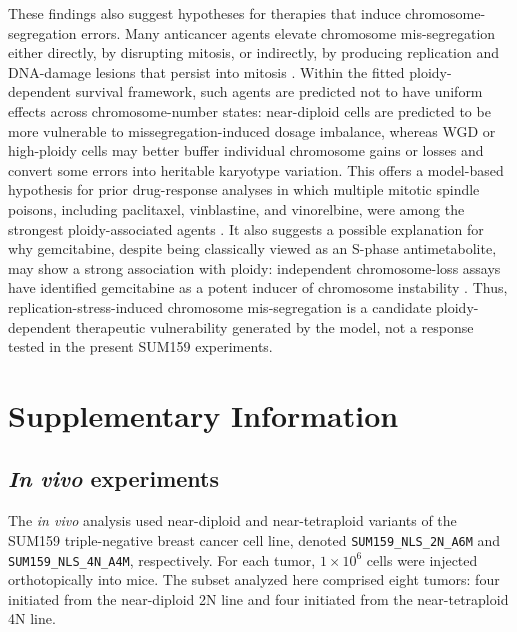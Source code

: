 \documentclass[11pt]{article}
\begin{document}
These findings also suggest hypotheses for therapies that induce chromosome-segregation errors. Many anticancer agents elevate chromosome mis-segregation either directly, by disrupting mitosis, or indirectly, by producing replication and DNA-damage lesions that persist into mitosis \cite{lee_effects_2016,zasadil_cytotoxicity_2014,scribano_chromosomal_2021,pedersen_topbp1_2015,chan_replication_2009,minocherhomji_replication_2015,beeharry_centromere_2013}. Within the fitted ploidy-dependent survival framework, such agents are predicted not to have uniform effects across chromosome-number states: near-diploid cells are predicted to be more vulnerable to missegregation-induced dosage imbalance, whereas WGD or high-ploidy cells may better buffer individual chromosome gains or losses and convert some errors into heritable karyotype variation. This offers a model-based hypothesis for prior drug-response analyses in which multiple mitotic spindle poisons, including paclitaxel, vinblastine, and vinorelbine, were among the strongest ploidy-associated agents \cite{kimmel_integrating_2020}. It also suggests a possible explanation for why gemcitabine, despite being classically viewed as an S-phase antimetabolite, may show a strong association with ploidy: independent chromosome-loss assays have identified gemcitabine as a potent inducer of chromosome instability \cite{lee_effects_2016}. Thus, replication-stress-induced chromosome mis-segregation is a candidate ploidy-dependent therapeutic vulnerability generated by the model, not a response tested in the present SUM159 experiments.

\section{Supplementary Information}


\renewcommand{\figurename}{Supplementary Figure}
\setcounter{figure}{0}  
\renewcommand{\tablename}{Supplementary Table}
\setcounter{table}{0}  

\subsection{\textit{In vivo} experiments}
\label{invivo}

The \textit{in vivo} analysis used near-diploid and near-tetraploid variants of the SUM159 triple-negative breast cancer cell line, denoted \texttt{SUM159\_NLS\_2N\_A6M} and \texttt{SUM159\_NLS\_4N\_A4M}, respectively. For each tumor, $1 \times 10^6$ cells were injected orthotopically into mice. The subset analyzed here comprised eight tumors: four initiated from the near-diploid 2N line and four initiated from the near-tetraploid 4N line.
\end{document}
